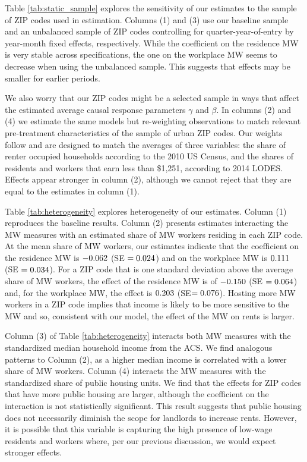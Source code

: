 Table \ref{tab:static_sample} explores the sensitivity of our estimates to 
the sample of ZIP codes used in estimation.
Columns (1) and (3) use our baseline sample and an unbalanced sample of 
ZIP codes controlling for quarter-year-of-entry by year-month fixed effects, 
respectively.
While the coefficient on the residence MW is very stable across specifications,
the one on the workplace MW seems to decrease when using the unbalanced
sample.
This suggests that effects may be smaller for earlier periods.

We also worry that our ZIP codes might be a selected sample in ways that affect
the estimated average causal response parameters $\gamma$ and $\beta$.
In columns (2) and (4) we estimate the same models but re-weighting 
observations to match relevant pre-treatment characteristics of the sample of 
urban ZIP codes.
Our weights follow \textcite{Hainmueller2012} and are designed to match the 
averages of three variables: 
the share of renter occupied households according to the 2010 US Census, and
the shares of residents and workers that earn less than \$1,251, according to
2014 LODES.
Effects appear stronger in column (2), although we cannot reject that they are 
equal to the estimates in column (1).

Table \ref{tab:heterogeneity} explores heterogeneity of our estimates.
Column (1) reproduces the baseline results.
Column (2) presents estimates interacting the MW measures with an estimated 
share of MW workers residing in each ZIP code.
At the mean share of MW workers, our estimates indicate that the coefficient on 
the residence MW is $-0.062$ (SE $=0.024$) and 
on the workplace MW is $0.111$ (SE $=0.034$).
For a ZIP code that is one standard deviation above the average share of MW 
workers, the effect of the residence MW is of $-0.150$ 
(SE $=0.064$) and, for the workplace MW, the effect is
$0.203$ (SE$=0.076$).
Hosting more MW workers in a ZIP code implies that income is likely to be more 
sensitive to the MW and so, consistent with our model, the effect of the MW
on rents is larger.

Column (3) of Table \ref{tab:heterogeneity} interacts both MW measures with the
standardized median household income from the ACS.
We find analogous patterns to Column (2), as a higher median income is 
correlated with a lower share of MW workers.
Column (4) interacts the MW measures with the standardized share of public 
housing units.
We find that the effects for ZIP codes that have more public housing are larger,
although the coefficient on the interaction is not statistically significant. 
This result suggests that public housing does not necessarily diminish the scope 
for landlords to increase rents.
However, it is possible that this variable is capturing the high presence of 
low-wage residents and workers where, per our previous discussion, we would 
expect stronger effects.

